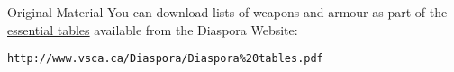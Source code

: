 
\begin{sidebox}{Original Material}
You can download lists of weapons and armour as part of the 
\href{http://www.vsca.ca/Diaspora/Diaspora\%20tables.pdf}{essential tables}
available from the Diaspora Website:

\texttt{http://www.vsca.ca/Diaspora/Diaspora\%20tables.pdf}
\end{sidebox}
